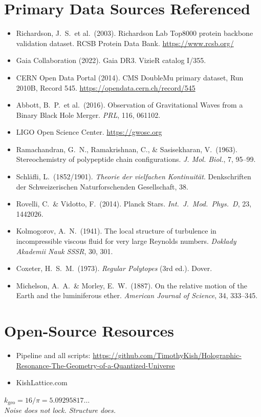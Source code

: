\documentclass[11pt, letterpaper, openany]{book}
\begin{document}
\section*{Primary Data Sources Referenced}
\begin{itemize}
    \item Richardson, J.~S.\ et al.\ (2003). Richardson Lab Top8000
    protein backbone validation dataset. RCSB Protein Data Bank.
    \url{https://www.rcsb.org/}
    \item Gaia Collaboration (2022). Gaia DR3. VizieR catalog I/355.
    \item CERN Open Data Portal (2014). CMS DoubleMu primary dataset,
    Run 2010B, Record 545. \url{https://opendata.cern.ch/record/545}
    \item Abbott, B.~P.\ et al.\ (2016). Observation of Gravitational
    Waves from a Binary Black Hole Merger. \textit{PRL}, 116, 061102.
    \item LIGO Open Science Center. \url{https://gwosc.org}
    \item Ramachandran, G.~N., Ramakrishnan, C., \& Sasisekharan, V.\
    (1963). Stereochemistry of polypeptide chain configurations.
    \textit{J. Mol. Biol.}, 7, 95--99.
    \item Schläfli, L.\ (1852/1901). \textit{Theorie der vielfachen
    Kontinuität}. Denkschriften der Schweizerischen
    Naturforschenden Gesellschaft, 38.
    \item Rovelli, C.\ \& Vidotto, F.\ (2014). Planck Stars.
    \textit{Int.\ J.\ Mod.\ Phys.\ D}, 23, 1442026.
    \item Kolmogorov, A.~N.\ (1941). The local structure of turbulence
    in incompressible viscous fluid for very large Reynolds numbers.
    \textit{Doklady Akademii Nauk SSSR}, 30, 301.
    \item Coxeter, H.~S.~M.\ (1973). \textit{Regular Polytopes}
    (3rd ed.). Dover.
    \item Michelson, A.~A.\ \& Morley, E.~W.\ (1887). On the relative
    motion of the Earth and the luminiferous ether. \textit{American
    Journal of Science}, 34, 333--345.
\end{itemize}

\section*{Open-Source Resources}
\begin{itemize}
    \item Pipeline and all scripts: \url{https://github.com/TimothyKish/Holographic-Resonance-The-Geometry-of-a-Quantized-Universe}
    \item KishLattice.com
\end{itemize}

\vfill
\begin{center}
$k_\text{geo} = 16/\pi = 5.09295817\ldots$ \\[0.5em]
\textit{Noise does not lock. Structure does.}
\end{center}
\end{document}

